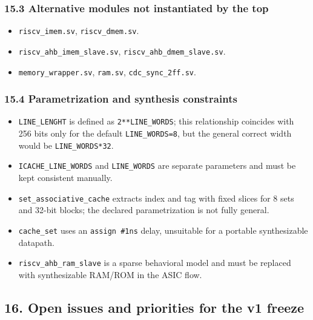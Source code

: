 \documentclass[]{article}
\providecommand{\tightlist}{%
  \setlength{\itemsep}{0pt}\setlength{\parskip}{0pt}}
\begin{document}
\hypertarget{153-alternative-modules-not-instantiated-by-the-top}{%
\subsubsection{15.3 Alternative modules not instantiated by the
top}\label{153-alternative-modules-not-instantiated-by-the-top}}

\begin{itemize}
\tightlist
\item
  \texttt{riscv\_imem.sv}, \texttt{riscv\_dmem.sv}.
\item
  \texttt{riscv\_ahb\_imem\_slave.sv},
  \texttt{riscv\_ahb\_dmem\_slave.sv}.
\item
  \texttt{memory\_wrapper.sv}, \texttt{ram.sv},
  \texttt{cdc\_sync\_2ff.sv}.
\end{itemize}

\hypertarget{154-parametrization-and-synthesis-constraints}{%
\subsubsection{15.4 Parametrization and synthesis
constraints}\label{154-parametrization-and-synthesis-constraints}}

\begin{itemize}
\tightlist
\item
  \texttt{LINE\_LENGHT} is defined as \texttt{2**LINE\_WORDS}; this
  relationship coincides with 256 bits only for the default
  \texttt{LINE\_WORDS=8}, but the general correct width would be
  \texttt{LINE\_WORDS*32}.
\item
  \texttt{ICACHE\_LINE\_WORDS} and \texttt{LINE\_WORDS} are separate
  parameters and must be kept consistent manually.
\item
  \texttt{set\_associative\_cache} extracts index and tag with fixed
  slices for 8 sets and 32-bit blocks; the declared parametrization is
  not fully general.
\item
  \texttt{cache\_set} uses an \texttt{assign\ \#1ns} delay, unsuitable
  for a portable synthesizable datapath.
\item
  \texttt{riscv\_ahb\_ram\_slave} is a sparse behavioral model and must
  be replaced with synthesizable RAM/ROM in the ASIC flow.
\end{itemize}

\hypertarget{16-open-issues-and-priorities-for-the-v1-freeze}{%
\subsection{16. Open issues and priorities for the v1
freeze}\label{16-open-issues-and-priorities-for-the-v1-freeze}}
\end{document}
